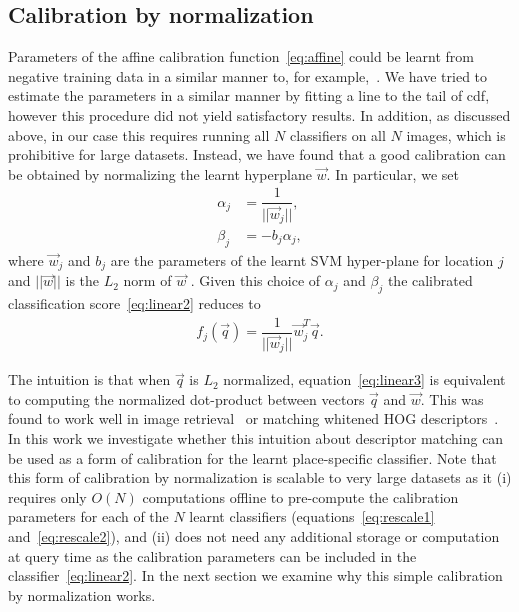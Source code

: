   \subsection{Calibration by normalization}
  Parameters of the affine calibration function~\eqref{eq:affine} could be learnt from negative training data in a similar manner to, for example,~\cite{Aubry14}. 
  We have tried to estimate the parameters in a similar manner by fitting a line to the tail of cdf, however this procedure did not yield satisfactory results.
  In addition, as discussed above, in our case this requires running all $N$ classifiers on all $N$ images, which is prohibitive for large datasets.
  Instead, we have found that a good calibration can be obtained by normalizing the learnt hyperplane $\vec{w}$. In particular, we set 
    \begin{align}
      \label{eq:rescale1}
      \alpha_j &= \dfrac{1}{||\vec{w}_j||},\\ 
      \label{eq:rescale2}
      \beta_j &=  -b_j \alpha_j, 
    \end{align}
  where $\vec{w}_j$ and $b_j$ are the parameters of the learnt SVM hyper-plane for location $j$ and $||\vec{w}||$ is the $L_2$ norm of $\vec{w}$ . Given this choice of $\alpha_j$ and $\beta_j$ the calibrated classification score~\eqref{eq:linear2} reduces to
      \begin{align}
        f_j(\vec{q}) = \dfrac{1}{||\vec{w}_j||}\vec{w}_j^T\vec{q}.
            \label{eq:linear3}
     \end{align}

  The intuition is that when $\vec{q}$ is $L_2$ normalized, equation~\eqref{eq:linear3} is equivalent to computing the normalized dot-product between vectors $\vec{q}$ and $\vec{w}$.       This was found to work well in image retrieval~\cite{Sivic03} or matching whitened HOG descriptors~\cite{Doersch13}.
  In this work we investigate whether this intuition about descriptor matching can be used as a form of calibration for the learnt place-specific classifier.  
  Note  that this form of calibration by normalization is scalable to very large datasets as it (i) requires only $O(N)$ computations offline to pre-compute the calibration parameters for each of the $N$ learnt classifiers (equations~\eqref{eq:rescale1} and~\eqref{eq:rescale2}), and (ii) does not need any additional storage or computation at query time as the calibration parameters can be included in the classifier~\eqref{eq:linear2}. In the next section we examine why this simple calibration by normalization works.


